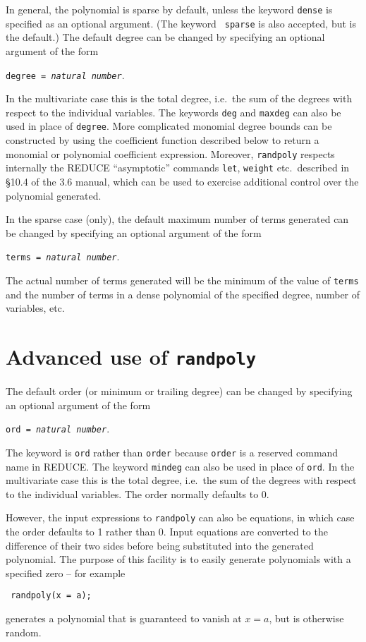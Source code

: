 In general, the polynomial is sparse by default, unless the keyword
{\tt dense} is specified as an optional argument.  (The keyword {\tt
sparse} is also accepted, but is the default.)  The default degree can
be changed by specifying an optional argument of the form
\begin{center}
  {\tt degree = {\it natural number}}.
\end{center}
In the multivariate case this is the total degree, i.e.\ the sum of
the degrees with respect to the individual variables.  The keywords
{\tt deg} and {\tt maxdeg} can also be used in place of {\tt degree}.
More complicated monomial degree bounds can be constructed by using
the coefficient function described below to return a monomial or
polynomial coefficient expression.  Moreover, {\tt randpoly} respects
internally the REDUCE ``asymptotic'' commands {\tt let}, {\tt weight}
etc.\ described in \S10.4 of the \REDUCE{} 3.6 manual, which can be used
to exercise additional control over the polynomial generated.

In the sparse case (only), the default maximum number of terms
generated can be changed by specifying an optional argument of the
form
\begin{center}
  {\tt terms = {\it natural number}}.
\end{center}
The actual number of terms generated will be the minimum of the value
of {\tt terms} and the number of terms in a dense polynomial of the
specified degree, number of variables, etc.


\section{Advanced use of {\tt randpoly}}
\label{sec:Advanced}

The default order (or minimum or trailing degree) can be changed by
specifying an optional argument of the form
\begin{center}
  {\tt ord = {\it natural number}}.
\end{center}
The keyword is {\tt ord} rather than {\tt order} because {\tt order}
is a reserved command name in REDUCE\@.  The keyword {\tt mindeg} can
also be used in place of {\tt ord}.  In the multivariate case this is
the total degree, i.e.\ the sum of the degrees with respect to the
individual variables.  The order normally defaults to 0.

However, the input expressions to {\tt randpoly} can also be
equations, in which case the order defaults to 1 rather than 0.  Input
equations are converted to the difference of their two sides before
being substituted into the generated polynomial.  The purpose of this
facility is to easily generate polynomials with a specified zero -- for
example
\begin{center}\tt
  randpoly(x = a);
\end{center}
generates a polynomial that is guaranteed to vanish at $x = a$, but is
otherwise random.


